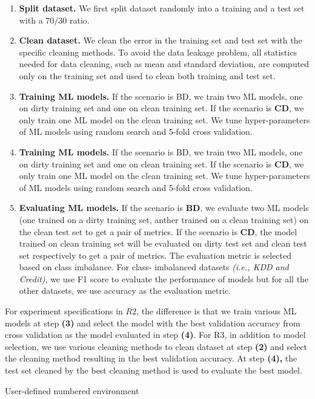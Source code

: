 \begin{enumerate}
	\item {
		\textbf{Split dataset.} We first split dataset randomly into a training
		and a test set with a $70/30$ ratio.
	}
	\item {
		\textbf{Clean dataset.} We clean the error in the training set and test
		set with the specific cleaning methods. To avoid the data
		leakage problem, all statistics needed for data cleaning, such
		as mean and standard deviation, are computed only on the
		training set and used to clean both training and test set.
    }
	\item {
		\textbf{Training ML models.} If the scenario is BD, we train two ML
		models, one on dirty training set and one on clean training
		set. If the scenario is \textbf{CD}, we only train one ML model on the
		clean training set. We tune hyper-parameters of ML models
		using random search and 5-fold cross validation.
	}
	\item {
		\textbf{Training ML models.} If the scenario is BD, we train two ML
		models, one on dirty training set and one on clean training
		set. If the scenario is \textbf{CD}, we only train one ML model on the
		clean training set. We tune hyper-parameters of ML models
		using random search and 5-fold cross validation.
	}
	\item {
		\textbf{Evaluating ML models.} If the scenario is \textbf{BD}, we evaluate
		two ML models (one trained on a dirty training set, anther
		trained on a clean training set) on the clean test set to get
		a pair of metrics. If the scenario is \textbf{CD}, the model trained
		on clean training set will be evaluated on dirty test set and
		clean test set respectively to get a pair of metrics. The evaluation metric is selected based on class imbalance. For class-
		imbalanced datasets \textit{(i.e., KDD and Credit)}, we use F1 score
		to evaluate the performance of models but for all the other
		datasets, we use accuracy as the evaluation metric.
	}
\end{enumerate}

For experiment specifications in $R2$, the difference is that we
train various ML models at step \textbf{(3)} and select the model with the
best validation accuracy from cross validation as the model evaluated in step \textbf{(4)}. 
For R3, in addition to model selection, we use
various cleaning methods to clean dataset at step \textbf{(2)} and select the cleaning method resulting in the best validation accuracy. At step
\textbf{(4),} the test set cleaned by the best cleaning method is used to evaluate the best model.

\newtheorem{SampleEnv}{Sample Environment}[section]
\begin{example}
	User-defined numbered environment
\end{example}


